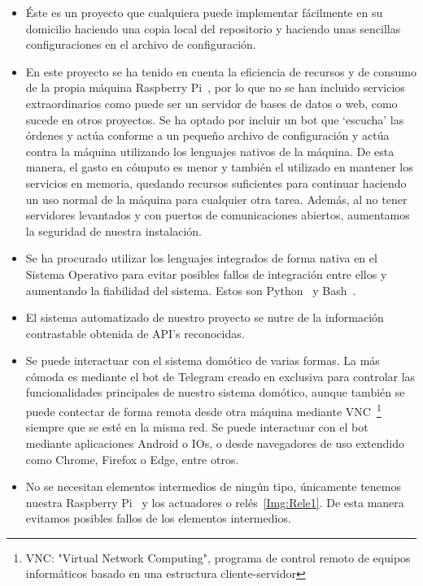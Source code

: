 \begin{itemize}
\tightlist
\item
    Éste es un proyecto que cualquiera puede implementar fácilmente en su domicilio haciendo una copia local del repositorio y haciendo unas sencillas configuraciones en el archivo de configuración.
    
\item
    En este proyecto se ha tenido en cuenta la eficiencia de recursos y de consumo de la propia máquina Raspberry Pi~\cite{misc:RbPWeb}, por lo que no se han incluido servicios extraordinarios como puede ser un servidor de bases de datos o web, como sucede en otros proyectos. Se ha optado por incluir un bot que `escucha' las órdenes y actúa conforme a un pequeño archivo de configuración y actúa contra la máquina utilizando los lenguajes nativos de la máquina. De esta manera, el gasto en cómputo es menor y también el utilizado en mantener los servicios en memoria, quedando recursos suficientes para continuar haciendo un uso normal de la máquina para cualquier otra tarea.
    Además, al no tener servidores levantados y con puertos de comunicaciones abiertos, aumentamos la seguridad de nuestra instalación.

\item
    Se ha procurado utilizar los lenguajes integrados de forma nativa en el Sistema Operativo para evitar posibles fallos de integración entre ellos y aumentando la fiabilidad del sistema. Estos son Python~\cite{misc:Python} y Bash~\cite{misc:Linux}. 
    
\item
    El sistema automatizado de nuestro proyecto se nutre de la información contrastable obtenida de API's reconocidas.
    
\item
    Se puede interactuar con el sistema domótico de varias formas. La más cómoda es mediante el bot de Telegram creado en exclusiva para controlar las funcionalidades principales de nuestro sistema domótico, aunque también se puede contectar de forma remota desde otra máquina mediante VNC~\footnote{VNC: "Virtual Network Computing", programa de control remoto de equipos informáticos basado en una estructura cliente-servidor} siempre que se esté en la misma red. Se puede interactuar con el bot mediante aplicaciones Android o IOs, o desde navegadores de uso extendido como Chrome, Firefox o Edge, entre otros.
    
\item
    No se necesitan elementos intermedios de ningún tipo, únicamente tenemos nuestra Raspberry Pi~\cite{misc:RbPWeb} y los actuadores o relés~\ref{Img:Rele1}. De esta manera evitamos posibles fallos de los elementos intermedios.
    \begin{comment}
        --> TODO: Esta situación podemos comprobarla en la imagen PLANO GENERAL DE LA INSTALACIÓN
    \end{comment}
    

\end{itemize}

